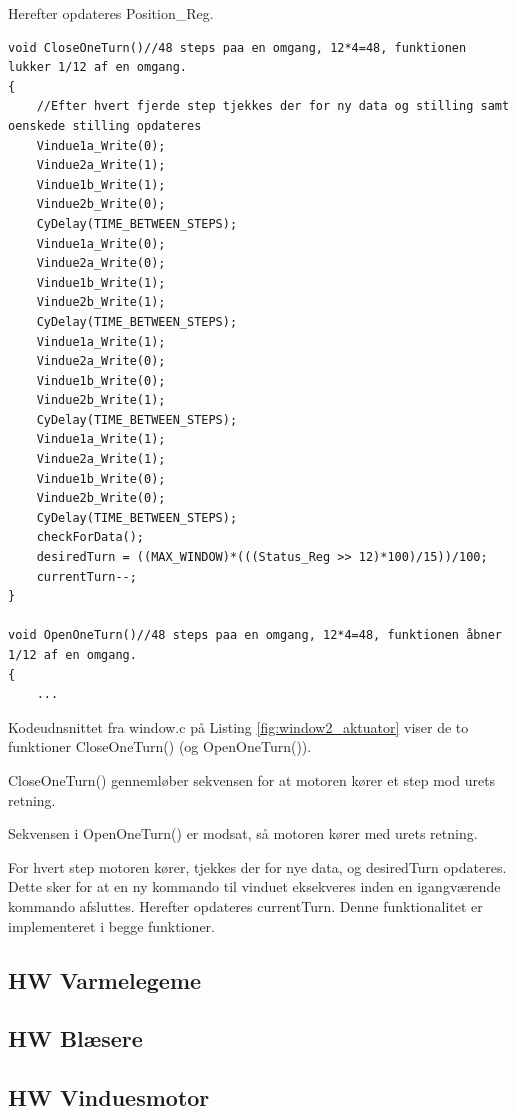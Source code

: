 Herefter opdateres Position\_Reg.

\clearpage

\begin{lstlisting}[caption=Udsnit B af window.c for PSoC4 i Aktuator, label=fig:window2_aktuator]
void CloseOneTurn()//48 steps paa en omgang, 12*4=48, funktionen lukker 1/12 af en omgang.
{
    //Efter hvert fjerde step tjekkes der for ny data og stilling samt oenskede stilling opdateres
    Vindue1a_Write(0);
    Vindue2a_Write(1);
    Vindue1b_Write(1);
    Vindue2b_Write(0);
    CyDelay(TIME_BETWEEN_STEPS);
    Vindue1a_Write(0);
    Vindue2a_Write(0);
    Vindue1b_Write(1);
    Vindue2b_Write(1);
    CyDelay(TIME_BETWEEN_STEPS);
    Vindue1a_Write(1);
    Vindue2a_Write(0);
    Vindue1b_Write(0);
    Vindue2b_Write(1);
    CyDelay(TIME_BETWEEN_STEPS);
    Vindue1a_Write(1);
    Vindue2a_Write(1);
    Vindue1b_Write(0);
    Vindue2b_Write(0);
    CyDelay(TIME_BETWEEN_STEPS);
    checkForData();
    desiredTurn = ((MAX_WINDOW)*(((Status_Reg >> 12)*100)/15))/100;
    currentTurn--;
}

void OpenOneTurn()//48 steps paa en omgang, 12*4=48, funktionen åbner 1/12 af en omgang.
{
    ...
\end{lstlisting}

Kodeudnsnittet fra window.c på Listing \ref{fig:window2_aktuator} viser de to funktioner CloseOneTurn() (og OpenOneTurn()). 

CloseOneTurn() gennemløber sekvensen for at motoren kører et step mod urets retning.

Sekvensen i OpenOneTurn() er modsat, så motoren kører med urets retning. 

For hvert step motoren kører, tjekkes der for nye data, og desiredTurn opdateres. Dette sker for at en ny kommando til vinduet eksekveres inden en igangværende kommando afsluttes. Herefter opdateres currentTurn. Denne funktionalitet er implementeret i begge funktioner.

\clearpage

\subsection{HW Varmelegeme}

\subsection{HW Blæsere}

\subsection{HW Vinduesmotor}